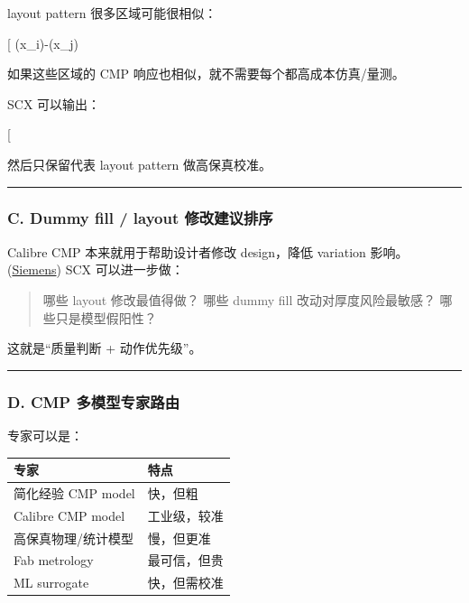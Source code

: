 \documentclass[
  12pt,
]{ctexart}
\begin{document}
layout pattern 很多区域可能很相似：

{[} \textbar{}\phi(x\_i)-\phi(x\_j)\textbar{}\approx 0{]}

如果这些区域的 CMP 响应也相似，就不需要每个都高成本仿真/量测。

SCX 可以输出：

{[} \text{redundant CMP states}{]}

然后只保留代表 layout pattern 做高保真校准。

\begin{center}\rule{0.5\linewidth}{0.5pt}\end{center}

\subsubsection{C. Dummy fill / layout
修改建议排序}\label{c.-dummy-fill-layout-ux4feeux6539ux5efaux8baeux6392ux5e8f}

Calibre CMP 本来就用于帮助设计者修改 design，降低 variation
影响。(\href{https://arxiv.org/abs/2501.07314?utm_source=chatgpt.com}{Siemens})
SCX 可以进一步做：

\begin{quote}
哪些 layout 修改最值得做？ 哪些 dummy fill 改动对厚度风险最敏感？
哪些只是模型假阳性？
\end{quote}

这就是``质量判断 + 动作优先级''。

\begin{center}\rule{0.5\linewidth}{0.5pt}\end{center}

\subsubsection{D. CMP
多模型专家路由}\label{d.-cmp-ux591aux6a21ux578bux4e13ux5bb6ux8defux7531}

专家可以是：

\begin{longtable}[]{@{}ll@{}}
\toprule\noalign{}
专家 & 特点 \\
\midrule\noalign{}
\endhead
\bottomrule\noalign{}
\endlastfoot
简化经验 CMP model & 快，但粗 \\
Calibre CMP model & 工业级，较准 \\
高保真物理/统计模型 & 慢，但更准 \\
Fab metrology & 最可信，但贵 \\
ML surrogate & 快，但需校准 \\
\end{longtable}
\end{document}
